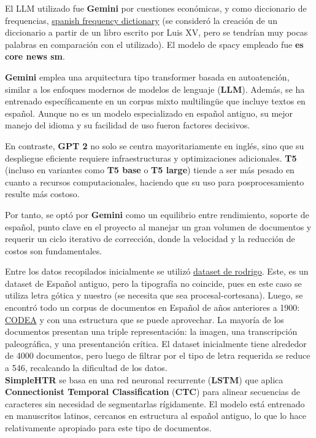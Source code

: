 \documentclass[11pt,a4paper]{article}
\begin{document}
El LLM utilizado fue \textbf{Gemini} por cuestiones económicas, y como diccionario de frequencias, \href{https://github.com/hermitdave/FrequencyWords/blob/master/content/2016/es/es_full.txt}{spanish frequency dictionary} (se consideró la creaci\'on de un diccionario a partir de un libro escrito por Luis XV, pero se tendr\'ian muy pocas palabras en comparaci\'on con el utilizado). El modelo de spacy empleado fue \textbf{es core news sm}.

\textbf{Gemini} emplea una arquitectura tipo transformer basada en autoatención, similar a los enfoques modernos de modelos de lenguaje (\textbf{LLM}).  Además, se ha entrenado específicamente en un corpus mixto multilingüe que incluye textos en español. Aunque no es un modelo especializado en español antiguo, su mejor manejo del idioma y su facilidad de uso fueron factores decisivos.

En contraste, \textbf{GPT 2} no solo se centra mayoritariamente en inglés, sino que su despliegue eficiente requiere infraestructuras y optimizaciones adicionales. \textbf{T5} (incluso en variantes como \textbf{T5 base} o \textbf{T5 large}) tiende a ser más pesado en cuanto a recursos computacionales, haciendo que su uso para posprocesamiento resulte más costoso.

Por tanto, se optó por \textbf{Gemini} como un equilibrio entre rendimiento, soporte de español, punto clave en el proyecto al manejar un gran volumen de documentos y requerir un ciclo iterativo de corrección, donde la velocidad y la reducción de costos son fundamentales.

Entre los datos recopilados inicialmente se utiliz\'o \href{https://zenodo.org/records/1490009/files/Rodrigo%20corpus%201.0.0.tar.gz?download=1}{dataset de rodrigo}. Este, es un dataset de Español antiguo, pero la tipograf\'ia no coincide, pues en este caso se utiliza letra g\'otica y nuestro (se necesita que sea procesal-cortesana). Luego, se encontr\'o todo un corpus de documentos en Español de años anteriores a 1900: \href{https://corpuscodea.es/}{CODEA} y con una estructura que se puede aprovechar. La mayor\'ia de los documentos presentan una triple representaci\'on: la imagen, una transcripción paleogr\'afica, y una presentanci\'on cr\'itica. El dataset inicialmente tiene alrededor de 4000 documentos, pero luego de filtrar por el tipo de letra requerida se reduce a 546, recalcando la dificultad de los datos.\\

\textbf{SimpleHTR} se basa en una red neuronal recurrente (\textbf{LSTM}) que aplica \textbf{Connectionist Temporal Classification} (\textbf{CTC}) para alinear secuencias de caracteres sin necesidad de segmentarlas rígidamente. El modelo está entrenado en manuscritos latinos, cercanos en estructura al español antiguo, lo que lo hace relativamente apropiado para este tipo de documentos.
\end{document}
